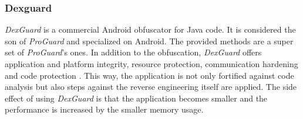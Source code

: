 \subsubsection{Dexguard} \label{subsection:counter-obfuscation-solution-dexguard}
\textit{DexGuard} is a commercial Android obfuscator for Java code.
It is considered the son of \textit{ProGuard} and specialized on Android.
The provided methods are a super set of \textit{ProGuard}'s ones. \cite{strazzareLevel0}
\newline
In addition to the obfuscation, \textit{DexGuard} offers application and platform integrity, resource protection, communication hardening and code protection \cite{dexguard}.
This way, the application is not only fortified against code analysis but also steps against the reverse engineering itself are applied.
\newline
The side effect of using \textit{DexGuard} is that the application becomes smaller and the performance is increased by the smaller memory usage.
